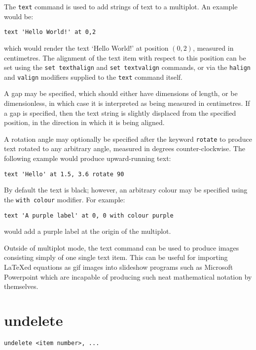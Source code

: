 The {\tt text} command is used to add strings of text to a multiplot. An
example would be:

\begin{verbatim}
text 'Hello World!' at 0,2
\end{verbatim}

\noindent which would render the text `Hello World!' at position $(0,2)$,
measured in centimetres. The alignment of the text item with respect to this
position can be set using the {\tt set texthalign} and {\tt set textvalign}
commands, or via the {\tt halign} and {\tt valign} modifiers supplied to the
{\tt text} command itself.

A gap may be specified, which should either have dimensions of length, or be
dimensionless, in which case it is interpreted as being measured in
centimetres. If a gap is specified, then the text string is slightly displaced
from the specified position, in the direction in which it is being aligned.

A rotation angle may optionally be specified after the keyword {\tt rotate}
to produce text rotated to any arbitrary angle, measured in degrees
counter-clockwise. The following example would produce upward-running text:

\begin{verbatim}
text 'Hello' at 1.5, 3.6 rotate 90
\end{verbatim}

By default the text is black; however, an arbitrary colour may be specified
using the {\tt with colour} modifier.  For example:

\begin{verbatim}
text 'A purple label' at 0, 0 with colour purple
\end{verbatim}

\noindent would add a purple label at the origin of the multiplot.

Outside of multiplot mode, the text command can be used to produce images
consisting simply of one single text item. This can be useful for importing
\LaTeX ed equations as gif images into slideshow programs such as Microsoft
Powerpoint which are incapable of producing such neat mathematical notation
by themselves.


\section{undelete}

\begin{verbatim}
undelete <item number>, ...
\end{verbatim}

